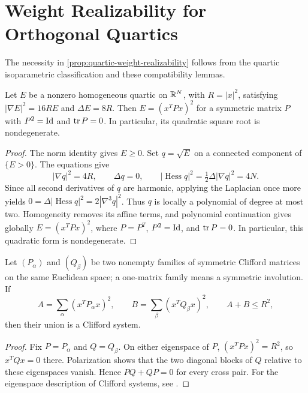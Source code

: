 \section[Weight Realizability]{Weight Realizability for Orthogonal Quartics}
\label{app:quartic-weight-realizability}

The necessity in \cref{prop:quartic-weight-realizability} follows
from the quartic isoparametric classification and these compatibility lemmas.

\begin{lemma}
\label{lem:quartic-weight-one}
Let $E$ be a nonzero homogeneous quartic on $\mathbb R^N$, with $R=|x|^2$,
satisfying $|\nabla E|^2=16RE$ and $\Delta E=8R$.
Then $E=(x^TPx)^2$ for a symmetric matrix $P$ with
$P^2=\operatorname{Id}$ and $\operatorname{tr} P=0$. In particular, its quadratic square root
is nondegenerate.
\end{lemma}

\begin{proof}
The norm identity gives $E\geq0$. Set $q=\sqrt E$ on a connected
component of $\{E>0\}$. The equations give
\[
 |\nabla q|^2=4R,\qquad \Delta q=0,\qquad
 |\operatorname{Hess}q|^2=\tfrac12\Delta|\nabla q|^2=4N.
\]
Since all second derivatives of $q$ are harmonic, applying the
Laplacian once more yields
$0=\Delta|\operatorname{Hess}q|^2=2|\nabla^3q|^2$.
Thus $q$ is locally a polynomial of degree at most two. Homogeneity
removes its affine terms, and polynomial continuation gives globally
$E=(x^TPx)^2$, where $P=P^T$, $P^2=\operatorname{Id}$, and $\operatorname{tr} P=0$.
In particular, this quadratic form is nondegenerate.
\end{proof}

\begin{lemma}
\label{lem:quartic-Clifford-joining}
Let $(P_\alpha)$ and $(Q_\beta)$ be two nonempty families of symmetric
Clifford matrices on the same Euclidean space; a one-matrix family
means a symmetric involution. If
\[
 A=\sum_\alpha(x^TP_\alpha x)^2,\qquad
 B=\sum_\beta(x^TQ_\beta x)^2,\qquad A+B\leq R^2,
\]
then their union is a Clifford system.
\end{lemma}

\begin{proof}
Fix $P=P_\alpha$ and $Q=Q_\beta$.
On either eigenspace of $P$, $(x^TPx)^2=R^2$, so $x^TQx=0$ there.
Polarization shows that the two diagonal blocks of $Q$ relative to
these eigenspaces vanish. Hence $PQ+QP=0$ for every cross pair.
For the eigenspace description of Clifford systems, see
\cite[Section~3.9, pp.~164--165]{CecilRyan15}.
\end{proof}

